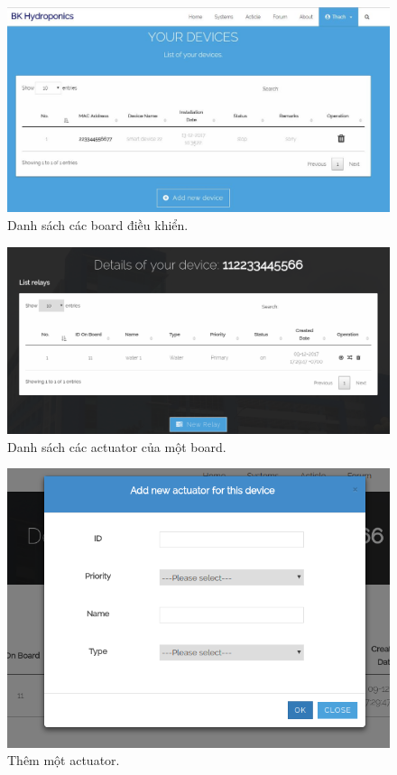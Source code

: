 \documentclass[a4paper,12pt,oneside]{article}
\begin{document}
\begin{center}
\begin{figure}[H]
\begin{center}
\includegraphics[scale=.5]{hinh/web_devices.jpg}
\end{center}
\caption{Danh sách các board điều khiển.}
\end{figure}

\begin{figure}[H]
\begin{center}
\includegraphics[scale=.4]{hinh/web_actuator_list.png}
\end{center}
\caption{Danh sách các actuator của một board.}
\end{figure}

\begin{figure}[H]
\begin{center}
\includegraphics[scale=.5]{hinh/web_add_actuator.png}
\end{center}
\caption{Thêm một actuator.}
\end{figure}


\end{center}
\end{document}
